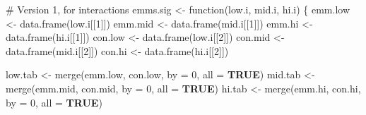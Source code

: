 \documentclass[
  bookmarksnumbered]{article}
\newenvironment{Shaded}{\begin{snugshade}}{\end{snugshade}}
\newcommand{\AttributeTok}[1]{\textcolor[rgb]{0.80,0.80,0.80}{#1}}
\newcommand{\CommentTok}[1]{\textcolor[rgb]{0.50,0.62,0.50}{#1}}
\newcommand{\ConstantTok}[1]{\textcolor[rgb]{0.86,0.64,0.64}{\textbf{#1}}}
\newcommand{\ControlFlowTok}[1]{\textcolor[rgb]{0.94,0.87,0.69}{#1}}
\newcommand{\DecValTok}[1]{\textcolor[rgb]{0.86,0.86,0.80}{#1}}
\newcommand{\FunctionTok}[1]{\textcolor[rgb]{0.94,0.94,0.56}{#1}}
\newcommand{\NormalTok}[1]{\textcolor[rgb]{0.80,0.80,0.80}{#1}}
\newcommand{\OtherTok}[1]{\textcolor[rgb]{0.94,0.94,0.56}{#1}}
\begin{document}
\begin{Shaded}
\begin{Highlighting}[]
\CommentTok{\# Version 1, for interactions}
\NormalTok{emms.sig }\OtherTok{\textless{}{-}} \ControlFlowTok{function}\NormalTok{(low.i, mid.i, hi.i) \{}
\NormalTok{  emm.low }\OtherTok{\textless{}{-}} \FunctionTok{data.frame}\NormalTok{(low.i[[}\DecValTok{1}\NormalTok{]])}
\NormalTok{  emm.mid }\OtherTok{\textless{}{-}} \FunctionTok{data.frame}\NormalTok{(mid.i[[}\DecValTok{1}\NormalTok{]])}
\NormalTok{  emm.hi }\OtherTok{\textless{}{-}} \FunctionTok{data.frame}\NormalTok{(hi.i[[}\DecValTok{1}\NormalTok{]])}
\NormalTok{  con.low }\OtherTok{\textless{}{-}} \FunctionTok{data.frame}\NormalTok{(low.i[[}\DecValTok{2}\NormalTok{]])}
\NormalTok{  con.mid }\OtherTok{\textless{}{-}} \FunctionTok{data.frame}\NormalTok{(mid.i[[}\DecValTok{2}\NormalTok{]])}
\NormalTok{  con.hi }\OtherTok{\textless{}{-}} \FunctionTok{data.frame}\NormalTok{(hi.i[[}\DecValTok{2}\NormalTok{]]) }
  
\NormalTok{  low.tab }\OtherTok{\textless{}{-}} \FunctionTok{merge}\NormalTok{(emm.low, con.low, }\AttributeTok{by =} \DecValTok{0}\NormalTok{, }\AttributeTok{all =} \ConstantTok{TRUE}\NormalTok{)}
\NormalTok{  mid.tab }\OtherTok{\textless{}{-}} \FunctionTok{merge}\NormalTok{(emm.mid, con.mid, }\AttributeTok{by =} \DecValTok{0}\NormalTok{, }\AttributeTok{all =} \ConstantTok{TRUE}\NormalTok{)}
\NormalTok{  hi.tab }\OtherTok{\textless{}{-}} \FunctionTok{merge}\NormalTok{(emm.hi, con.hi, }\AttributeTok{by =} \DecValTok{0}\NormalTok{, }\AttributeTok{all =} \ConstantTok{TRUE}\NormalTok{)}
  

\end{Highlighting}
\end{Shaded}
\end{document}
